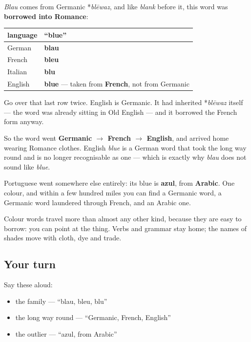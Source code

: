 \begin{cousinweb}
\emph{Blau} comes from Germanic *\emph{blēwaz}, and like \emph{blank} before it, this word was \textbf{borrowed into Romance}:

\noindent
\begin{tabularx}{\linewidth}{@{}>{\raggedright\arraybackslash}X>{\raggedright\arraybackslash}X@{}}
\toprule
\textbf{language} & \textbf{\textquotedblleft{}blue\textquotedblright{}} \\
\midrule
German & \textbf{blau} \\
French & \textbf{bleu} \\
Italian & \textbf{blu} \\
English & \textbf{blue} — taken from \textbf{French}, not from Germanic \\
\bottomrule
\end{tabularx}

Go over that last row twice. English is Germanic. It had inherited *\emph{blēwaz} itself — the word was already sitting in Old English — and it borrowed the French form anyway.

So the word went \textbf{Germanic $\to$ French $\to$ English}, and arrived home wearing Romance clothes. English \emph{blue} is a German word that took the long way round and is no longer recognisable as one — which is exactly why \emph{blau} does not sound like \emph{blue}.
\end{cousinweb}

\begin{culture}
Portuguese went somewhere else entirely: its blue is \textbf{azul}, from \textbf{Arabic}. One colour, and within a few hundred miles you can find a Germanic word, a Germanic word laundered through French, and an Arabic one.

Colour words travel more than almost any other kind, because they are easy to borrow: you can point at the thing. Verbs and grammar stay home; the names of shades move with cloth, dye and trade.
\end{culture}

\subsection*{Your turn}
Say these aloud:

\begin{itemize}
\raggedright
  \item the family — \textquotedblleft{}blau, bleu, blu\textquotedblright{}
  \item the long way round — \textquotedblleft{}Germanic, French, English\textquotedblright{}
  \item the outlier — \textquotedblleft{}azul, from Arabic\textquotedblright{}
\end{itemize}

